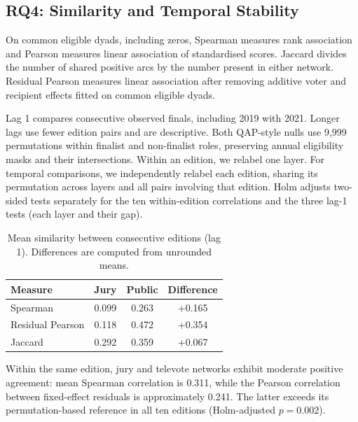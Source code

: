 \documentclass[12pt,a4paper]{article}
\begin{document}


\FloatBarrier

\subsection{RQ4: Similarity and Temporal Stability}
\label{sec:rq4}

On common eligible dyads, including zeros, Spearman measures rank
association and Pearson measures linear association of standardised
scores. Jaccard divides the number of shared positive arcs by the
number present in either network. Residual Pearson measures linear
association after removing additive voter and recipient effects
fitted on common eligible dyads.

Lag 1 compares consecutive observed finals, including 2019 with 2021.
Longer lags use fewer edition pairs and are descriptive. Both QAP-style
nulls \cite{krackhardt1988} use 9,999 permutations within finalist and
non-finalist roles, preserving annual eligibility masks and their
intersections. Within an edition, we relabel one layer. For temporal
comparisons, we independently relabel each edition, sharing its
permutation across layers and all pairs involving that edition.
Holm adjusts two-sided tests separately for the ten within-edition
correlations and the three lag-1 tests (each layer and their gap).

\begin{table}[htbp]
\centering
\caption{Mean similarity between consecutive
editions (lag 1). Differences are computed from
unrounded means.}
\label{tab:rq4_stability}
\small
\begin{tabular}{lccc}
\toprule
\textbf{Measure} &
\textbf{Jury} &
\textbf{Public} &
\textbf{Difference} \\
\midrule
Spearman & 0.099 & 0.263 & +0.165 \\
Residual Pearson & 0.118 & 0.472 & +0.354 \\
Jaccard & 0.292 & 0.359 & +0.067 \\
\bottomrule
\end{tabular}
\end{table}

Within the same edition, jury and televote
networks exhibit moderate positive agreement:
mean Spearman correlation is 0.311, while
the Pearson correlation between fixed-effect
residuals is approximately 0.241.
The latter exceeds its permutation-based
reference in all ten editions
(Holm-adjusted $p=0.002$).
\end{document}
